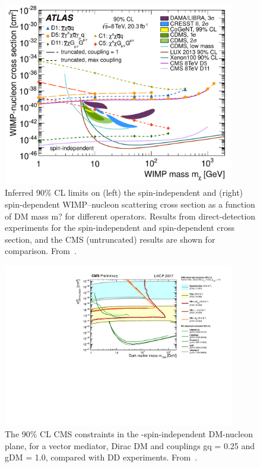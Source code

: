 \begin{figure}[!htpb]
\includegraphics[width=0.9\textwidth]{figures/Monojet8TeV_EFT_SI}
\caption{Inferred 90\% CL limits on (left) the spin-independent and (right) spin-dependent WIMP--nucleon scattering cross section as a function of DM mass m? for different operators. Results from direct-detection experiments for the spin-independent and spin-dependent cross section, and the CMS (untruncated) results are shown for comparison. From~\cite{monoXfig}.}
\label{fig:SIATLASEFT}
\end{figure}


\begin{figure}[!htpb]
\includegraphics[width=0.9\textwidth]{figures/SI_CMSDD_Summary}
\caption{The 90\% CL CMS constraints in the \mdm-spin-independent DM-nucleon plane, for a vector mediator, Dirac DM and couplings gq = 0.25 and gDM = 1.0, compared with DD experiments. From~\cite{CMSSummary}.}
\label{fig:SICMS}
\end{figure}

